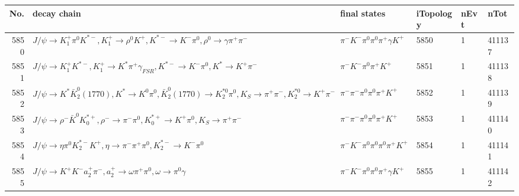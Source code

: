 \begin{table}[htbp] 
\begin{center}
\begin{small}
\begin{tabular}{rlllll}\hline\hline
 No. & decay chain & final states &  iTopology & nEvt & nTot \\\hline
5850&$J/\psi       \rightarrow K_1^{+}        \pi^{0}        K^{*-}         , K_1^{+}         \rightarrow \rho^{0}      K^{+}          , K^{*-}          \rightarrow K^{-}          \pi^{0}        , \rho^{0}       \rightarrow \gamma       \pi^{+}        \pi^{-}        $&$\pi^{-}        K^{-}          \pi^{0}        \pi^{0}        \pi^{+}        \gamma       K^{+}          $& 5850&    1&411137\\
5851&$J/\psi       \rightarrow K_1^{+}        K^{*-}         , K_1^{+}         \rightarrow K^{*}          \pi^{+}        \gamma_{FSR} , K^{*-}          \rightarrow K^{-}          \pi^{0}        , K^{*}           \rightarrow K^{+}          \pi^{-}        $&$\pi^{-}        K^{-}          \pi^{0}        \pi^{+}        K^{+}          $& 5851&    1&411138\\
5852&$J/\psi       \rightarrow K^{*}          \bar{K}_2^0(1770), K^{*}           \rightarrow K^{0}          \pi^{0}        , \bar{K}_2^0(1770) \rightarrow K_2^{*0}       \pi^{0}        , K_{S}           \rightarrow \pi^{+}        \pi^{-}        , K_2^{*0}        \rightarrow K^{+}          \pi^{-}        $&$\pi^{-}        \pi^{-}        \pi^{0}        \pi^{0}        \pi^{+}        K^{+}          $& 5852&    1&411139\\
5853&$J/\psi       \rightarrow \rho^{-}      \bar{K}^{0}   K_{0}^{*+}     , \rho^{-}       \rightarrow \pi^{-}        \pi^{0}        , K_{0}^{*+}      \rightarrow K^{+}          \pi^{0}        , K_{S}           \rightarrow \pi^{+}        \pi^{-}        $&$\pi^{-}        \pi^{-}        \pi^{0}        \pi^{0}        \pi^{+}        K^{+}          $& 5853&    1&411140\\
5854&$J/\psi       \rightarrow \eta          \pi^{0}        K_2^{*-}       K^{+}          , \eta           \rightarrow \pi^{-}        \pi^{+}        \pi^{0}        , K_2^{*-}        \rightarrow K^{-}          \pi^{0}        $&$\pi^{-}        K^{-}          \pi^{0}        \pi^{0}        \pi^{0}        \pi^{+}        K^{+}          $& 5854&    1&411141\\
5855&$J/\psi       \rightarrow K^{+}          K^{-}          a_{2}^{+}      \pi^{-}        , a_{2}^{+}       \rightarrow \omega         \pi^{+}        \pi^{0}        , \omega          \rightarrow \pi^{0}        \gamma       $&$\pi^{-}        K^{-}          \pi^{0}        \pi^{0}        \pi^{+}        \gamma       K^{+}          $& 5855&    1&411142\\

\end{tabular}
\end{small}
\end{center}
\end{table}
